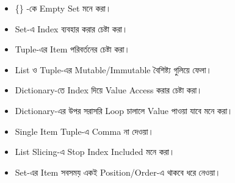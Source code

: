 \begin{rememberbox}

\begin{itemize}

\item
\textenglish{\ttfamily \{\}}
-কে Empty Set মনে করা।

\item Set-এ Index ব্যবহার করার চেষ্টা করা।

\item Tuple-এর Item পরিবর্তনের চেষ্টা করা।

\item List ও Tuple-এর Mutable/Immutable বৈশিষ্ট্য গুলিয়ে ফেলা।

\item Dictionary-তে Index দিয়ে Value Access করার চেষ্টা করা।

\item Dictionary-এর উপর সরাসরি Loop চালালে Value পাওয়া যাবে মনে করা।

\item Single Item Tuple-এ Comma না দেওয়া।

\item List Slicing-এ Stop Index Included মনে করা।

\item Set-এর Item সবসময় একই Position/Order-এ থাকবে ধরে নেওয়া।

\end{itemize}

\end{rememberbox}


